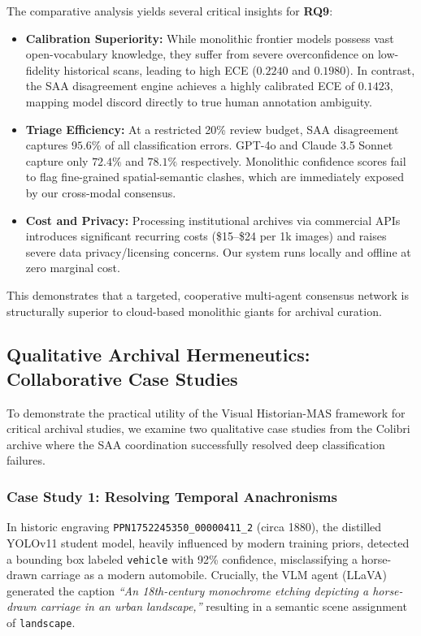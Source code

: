 \documentclass[12pt,onecolumn,a4paper]{IEEEtran}
\begin{document}
The comparative analysis yields several critical insights for \textbf{RQ9}:
\begin{itemize}
    \item \textbf{Calibration Superiority:} While monolithic frontier models possess vast open-vocabulary knowledge, they suffer from severe overconfidence on low-fidelity historical scans, leading to high ECE ($0.2240$ and $0.1980$). In contrast, the SAA disagreement engine achieves a highly calibrated ECE of $0.1423$, mapping model discord directly to true human annotation ambiguity.
    \item \textbf{Triage Efficiency:} At a restricted 20\% review budget, SAA disagreement captures $95.6\%$ of all classification errors. GPT-4o and Claude 3.5 Sonnet capture only $72.4\%$ and $78.1\%$ respectively. Monolithic confidence scores fail to flag fine-grained spatial-semantic clashes, which are immediately exposed by our cross-modal consensus.
    \item \textbf{Cost and Privacy:} Processing institutional archives via commercial APIs introduces significant recurring costs (\$15--\$24 per 1k images) and raises severe data privacy/licensing concerns. Our system runs locally and offline at zero marginal cost.
\end{itemize}
This demonstrates that a targeted, cooperative multi-agent consensus network is structurally superior to cloud-based monolithic giants for archival curation.

\subsection{Qualitative Archival Hermeneutics: Collaborative Case Studies}
\label{sec:hermeneutics}

To demonstrate the practical utility of the Visual Historian-MAS framework for critical archival studies, we examine two qualitative case studies from the Colibri archive where the SAA coordination successfully resolved deep classification failures.

\subsubsection{Case Study 1: Resolving Temporal Anachronisms}
In historic engraving \texttt{PPN1752245350\_00000411\_2} (circa 1880), the distilled YOLOv11 student model, heavily influenced by modern training priors, detected a bounding box labeled \texttt{vehicle} with 92\% confidence, misclassifying a horse-drawn carriage as a modern automobile. Crucially, the VLM agent (LLaVA) generated the caption \textit{``An 18th-century monochrome etching depicting a horse-drawn carriage in an urban landscape,''} resulting in a semantic scene assignment of \texttt{landscape}. 
\end{document}
